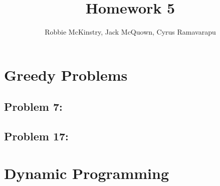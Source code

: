 \documentclass[12pt]{article}
\begin{document}
\title{Homework 5}
\author{Robbie McKinstry, Jack McQuown, Cyrus Ramavarapu}
\renewcommand{\today}{12 September 2016}
\renewcommand{\baselinestretch}{1.5}

\maketitle

\section*{Greedy Problems}
\subsection*{Problem 7:}

\subsection*{Problem 17:}

\section*{Dynamic Programming}
\end{document}
